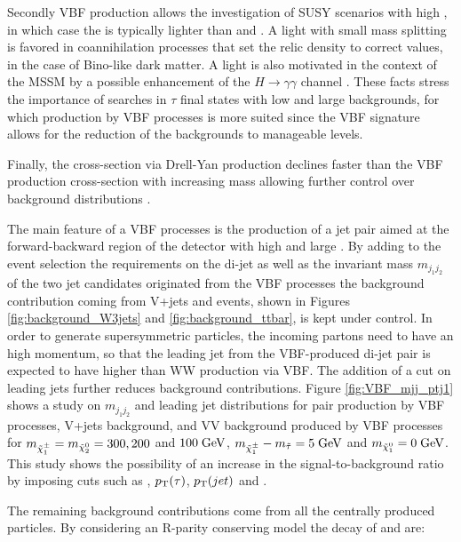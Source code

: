 Secondly VBF production allows the investigation of SUSY scenarios with high \tanbeta, in which case the \stau is typically lighter than  \smuon and \selectron  \cite{Hinchliffe:1999zc}. A light \stau with small mass splitting is favored in coannihilation processes \cite{Griest:1990kh} that set the relic density to correct values, in the case of Bino-like dark matter. A light \stau is also motivated in the context of the MSSM by a possible enhancement of the $H \longrightarrow \gamma\gamma$ channel \cite{Carena:2011aa}. These facts stress the importance of searches in $\tau$ final states with low \pt and large backgrounds, for which production by VBF processes is more suited since the VBF signature allows for the reduction of the backgrounds to manageable levels.

Finally, the cross-section via Drell-Yan production declines faster than the VBF production cross-section with increasing mass allowing further control over background distributions \cite{Datta:2002vy}.

The main feature of a VBF processes is the production of a jet pair aimed at the forward-backward region of the detector with high \pt and large \deltaeta. By adding to the event selection the requirements on the di-jet \deltaeta as well as the invariant mass \ensuremath{m_{j_{1}j_{2}}} of the two jet candidates originated from the VBF processes the background contribution coming from V+jets and \ttbar events, shown in Figures \ref{fig:background_W3jets} and \ref{fig:background_ttbar}, is kept under control. In order to generate supersymmetric particles, the incoming partons need to have an high momentum, so that the leading jet from the VBF-produced di-jet pair is expected to have higher \pt than WW production via VBF. The addition of a \pt cut on leading jets further reduces background contributions. Figure \ref{fig:VBF_mjj_ptj1} shows a study on \ensuremath{m_{j_{1}j_{2}}} and leading jet \pt distributions for \charginopm \charginopm pair production by VBF processes, V+jets background, and VV background produced by VBF processes for \ensuremath{m_{\charginopm} = m_{\neutralinotwo} = 300, 200} and \ensuremath{100\gev}, \ensuremath{m_{\charginopm} - m_{\tilde{\tau}} = 5\gev} and \ensuremath{m_{\neutralinoone} = 0\gev}. This study shows the possibility of an increase in the signal-to-background ratio by imposing cuts such as \mjj, $p_{\text{T}}(\tau)$, $p_{\text{T}}(jet)$ and \met. 

The remaining background contributions come from all the centrally produced particles. By considering an R-parity conserving model the decay of \charginopm and \neutralinotwo are:

